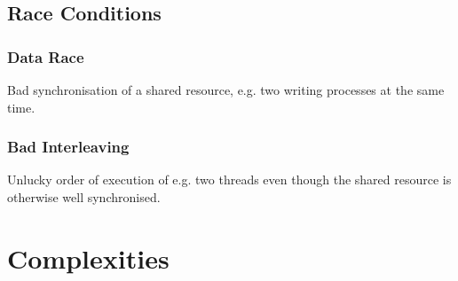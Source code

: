 \documentclass[10pt,landscape,a4paper, table]{extarticle}
\begin{document}
\begin{multicols*}{3}
\subsection{Race Conditions}
\subsubsection{Data Race}
Bad synchronisation of a shared resource, e.g. two writing processes at the same time.
\subsubsection{Bad Interleaving}
Unlucky order of execution of e.g. two threads even though the shared resource is otherwise well synchronised.

\section{Complexities}

{

}
\end{multicols*}
\end{document}
